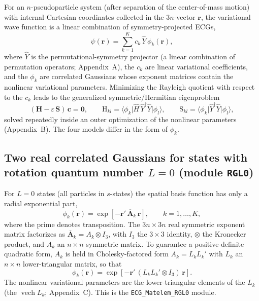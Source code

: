 \documentclass[11pt]{article}
\newcommand{\rvec}{\mathbf{r}}
\newcommand{\vech}{\operatorname{vech}}
\newcommand{\Hcal}{\hat{H}}
\newcommand{\Ycal}{\hat{Y}}
\begin{document}
For an $n$-pseudoparticle system (after separation of the center-of-mass
motion) with internal Cartesian coordinates collected in the $3n$-vector
$\rvec$, the variational wave function is a linear combination of
symmetry-projected ECGs,
\begin{equation}
\psi(\rvec)=\sum_{k=1}^{K} c_k\, \Ycal\, \phi_k(\rvec),
\end{equation}
where $\Ycal$ is the permutational-symmetry projector (a linear combination of
permutation operators; Appendix~A), the $c_k$ are linear variational
coefficients, and the $\phi_k$ are correlated Gaussians whose exponent matrices
contain the nonlinear variational parameters. Minimizing the Rayleigh quotient
with respect to the $c_k$ leads to the generalized symmetric/Hermitian
eigenproblem
\begin{equation}
(\mathbf{H}-\varepsilon\,\mathbf{S})\,\mathbf{c}=\mathbf{0},
\qquad
\mathrm{H}_{kl}=\big\langle \phi_k \big| \Hcal\, \Ycal^{\dagger}\Ycal \big| \phi_l \big\rangle,
\qquad
\mathrm{S}_{kl}=\big\langle \phi_k \big| \Ycal^{\dagger}\Ycal \big| \phi_l \big\rangle,
\end{equation}
solved repeatedly inside an outer optimization of the nonlinear parameters
(Appendix~B). The four models differ in the form of $\phi_k$.

\subsection{Two real correlated Gaussians for states with rotation quantum number \texorpdfstring{$L=0$}{L=0} (module \texttt{RGL0})}
\label{sec:rgl0}

For $L=0$ states (all particles in $s$-states) the spatial basis function has
only a radial exponential part,
\begin{equation}
\phi_k(\rvec)=\exp\!\left[-\rvec'\,\overline{\mathbf{A}}_k\,\rvec\right],
\qquad k=1,\dots,K,
\end{equation}
where the prime denotes transposition. The $3n\times 3n$ real symmetric
exponent matrix factorizes as $\overline{\mathbf{A}}_k=A_k\otimes I_3$, with
$I_3$ the $3\times 3$ identity, $\otimes$ the Kronecker product, and $A_k$ an
$n\times n$ symmetric matrix. To guarantee a positive-definite quadratic form,
$A_k$ is held in Cholesky-factored form $A_k=L_kL_k'$ with $L_k$ an $n\times n$
lower-triangular matrix, so that
\begin{equation}
\phi_k(\rvec)=\exp\!\left[-\rvec'\,(L_kL_k'\otimes I_3)\,\rvec\right].
\end{equation}
The nonlinear variational parameters are the lower-triangular elements of the
$L_k$ (the $\vech L_k$; Appendix~C). This is the \texttt{ECG\_Matelem\_RGL0}
module.
\end{document}
